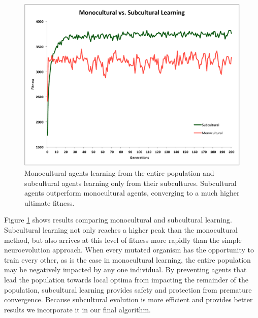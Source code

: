 \documentclass{sig-alternate}
\begin{document}
\begin{figure}
  \centering
    \includegraphics[scale=.41]{monocultural_vs_subcultural_learning.pdf}
  \caption{Monocultural agents learning from the entire population and subcultural agents learning only from their subcultures.  Subcultural agents outperform monocultural agents, converging to a much higher ultimate fitness.}
  \label{fig:population-social}
\end{figure}

Figure \ref{fig:population-social} shows results comparing monocultural and subcultural learning. Subcultural learning not only reaches a higher peak than the monocultural method, but also arrives at this level of fitness more rapidly than the simple neuroevolution approach. When every mutated organism has the opportunity to train every other, as is the case in monocultural learning, the entire population may be negatively impacted by any one individual. By preventing agents that lead the population towards local optima from impacting the remainder of the population, subcultural learning provides safety and protection from premature convergence.  Because subcultural evolution is more efficient and provides better results we incorporate it in our final algorithm.
\end{document}
